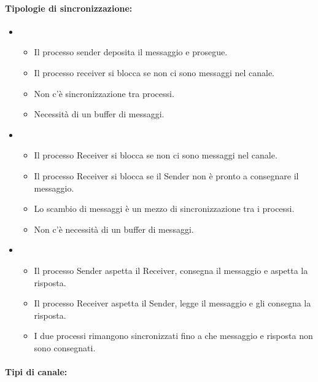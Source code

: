 \paragraph{Tipologie di sincronizzazione:}

\begin{itemize}
	\item {}
	      \begin{itemize}
		      \item Il processo sender deposita il messaggio e prosegue.
		      \item Il processo receiver si blocca se non ci sono messaggi nel canale.
		      \item Non c'è sincronizzazione tra processi.
		      \item Necessità di un buffer di messaggi.
	      \end{itemize}
	\item {}
	      \begin{itemize}
		      \item Il processo Receiver si blocca se non ci sono messaggi nel canale.
		      \item Il processo Receiver si blocca se il Sender non è pronto a consegnare il messaggio.
		      \item Lo scambio di messaggi è un mezzo di sincronizzazione tra i processi.
		      \item Non c’è necessità di un buffer di messaggi.
	      \end{itemize}
	\item {}
	      \begin{itemize}
		      \item Il processo Sender aspetta il Receiver, consegna il messaggio e aspetta la risposta.
		      \item Il processo Receiver aspetta il Sender, legge il messaggio e gli consegna la risposta.
		      \item I due processi rimangono sincronizzati fino a che messaggio e risposta non sono consegnati.
	      \end{itemize}
\end{itemize}

\paragraph{Tipi di canale:}

